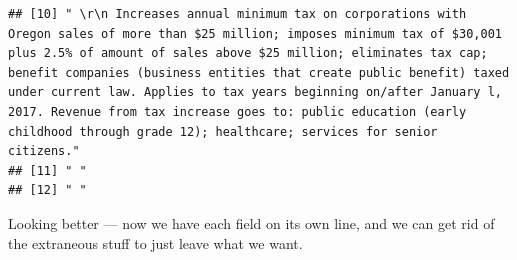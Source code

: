 \documentclass{article}\usepackage[]{graphicx}\usepackage[]{color}
\makeatletter
\newenvironment{kframe}{%
 \def\at@end@of@kframe{}%
 \ifinner\ifhmode%
  \def\at@end@of@kframe{\end{minipage}}%
  \begin{minipage}{\columnwidth}%
 \fi\fi%
 \def\FrameCommand##1{\hskip\@totalleftmargin \hskip-\fboxsep
 \colorbox{shadecolor}{##1}\hskip-\fboxsep
     \hskip-\linewidth \hskip-\@totalleftmargin \hskip\columnwidth}%
 \MakeFramed {\advance\hsize-\width
   \@totalleftmargin\z@ \linewidth\hsize
   \@setminipage}}%
 {\par\unskip\endMakeFramed%
 \at@end@of@kframe}
\newenvironment{knitrout}{}{} %
\makeatother
\begin{document}
\begin{knitrout}
\begin{kframe}
\begin{verbatim}
## [10] " \r\n Increases annual minimum tax on corporations with Oregon sales of more than $25 million; imposes minimum tax of $30,001 plus 2.5% of amount of sales above $25 million; eliminates tax cap; benefit companies (business entities that create public benefit) taxed under current law. Applies to tax years beginning on/after January l, 2017. Revenue from tax increase goes to: public education (early childhood through grade 12); healthcare; services for senior citizens."
## [11] " "                                                                                                                                                                                                                                                                                                                                                                                                                                                                                     
## [12] " "
\end{verbatim}
\end{kframe}
\end{knitrout}

Looking better --- now we have each field on its own line, and we can get rid of the extraneous stuff to just leave what we want.
\end{document}

